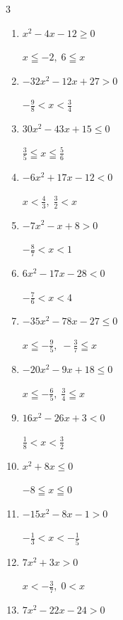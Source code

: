 \begin{multicols}{3}
\begin{enumerate}
  \item $x^{2}-4x-12\geq 0$

        $\displaystyle x \leqq -2 , \; 6 \leqq x$

  \item $-32x^{2}-12x+27>0$

        $\displaystyle -\frac{9}{8} < x < \frac{3}{4}$

  \item $30x^{2}-43x+15\leq 0$

        $\displaystyle \frac{3}{5} \leqq x \leqq \frac{5}{6}$

  \item $-6x^{2}+17x-12<0$

        $\displaystyle x < \frac{4}{3} , \; \frac{3}{2} < x$

  \item $-7x^{2}-x+8>0$

        $\displaystyle -\frac{8}{7} < x < 1$

  \item $6x^{2}-17x-28<0$

        $\displaystyle -\frac{7}{6} < x < 4$

  \item $-35x^{2}-78x-27\leq 0$

        $\displaystyle x \leqq -\frac{9}{5} , \; -\frac{3}{7} \leqq x$

  \item $-20x^{2}-9x+18\leq 0$

        $\displaystyle x \leqq -\frac{6}{5} , \; \frac{3}{4} \leqq x$

  \item $16x^{2}-26x+3<0$

        $\displaystyle \frac{1}{8} < x < \frac{3}{2}$

\columnbreak %

\resetques

  \item $x^{2}+8x\leq 0$

        $\displaystyle -8 \leqq x \leqq 0$

  \item $-15x^{2}-8x-1>0$

        $\displaystyle -\frac{1}{3} < x < -\frac{1}{5}$

  \item $7x^{2}+3x>0$

        $\displaystyle x < -\frac{3}{7} , \; 0 < x$

  \item $7x^{2}-22x-24>0$


\end{enumerate}
\end{multicols}
